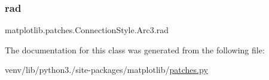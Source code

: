 \subsubsection{\texorpdfstring{rad}{rad}}
{\footnotesize\ttfamily matplotlib.\+patches.\+Connection\+Style.\+Arc3.\+rad}



The documentation for this class was generated from the following file\+:\begin{DoxyCompactItemize}
\item 
venv/lib/python3./site-\/packages/matplotlib/\hyperlink{patches_8py}{patches.\+py}\end{DoxyCompactItemize}
